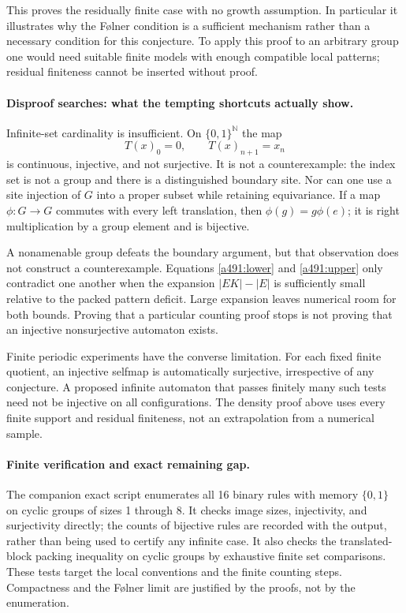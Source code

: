 \documentclass[11pt]{article}
\begin{document}
This proves the residually finite case with no growth assumption. In
particular it illustrates why the F\o lner condition is a sufficient
mechanism rather than a necessary condition for this conjecture. To apply
this proof to an arbitrary group one would need suitable finite models
with enough compatible local patterns; residual finiteness cannot be
inserted without proof.

\paragraph{Disproof searches: what the tempting shortcuts actually show.}
Infinite-set cardinality is insufficient. On $\{0,1\}^{\mathbb N}$ the map
\[
 T(x)_0=0,\qquad T(x)_{n+1}=x_n
\]
is continuous, injective, and not surjective. It is not a counterexample:
the index set is not a group and there is a distinguished boundary site.
Nor can one use a site injection of $G$ into a proper subset while retaining
equivariance. If a map $\phi:G\to G$ commutes with every left translation,
then $\phi(g)=g\phi(e)$; it is right multiplication by a group element
and is bijective.

A nonamenable group defeats the boundary argument, but that observation
does not construct a counterexample. Equations \eqref{a491:lower} and
\eqref{a491:upper} only contradict one another when the expansion
$|EK|-|E|$ is sufficiently small relative to the packed pattern deficit.
Large expansion leaves numerical room for both bounds. Proving that a
particular counting proof stops is not proving that an injective nonsurjective
automaton exists.

Finite periodic experiments have the converse limitation. For each
fixed finite quotient, an injective selfmap is automatically surjective,
irrespective of any conjecture. A proposed infinite automaton that passes
finitely many such tests need not be injective on all configurations.
The density proof above uses every finite support and residual finiteness,
not an extrapolation from a numerical sample.

\paragraph{Finite verification and exact remaining gap.}
The companion exact script enumerates all 16 binary rules with memory
$\{0,1\}$ on cyclic groups of sizes 1 through 8. It checks image sizes,
injectivity, and surjectivity directly; the counts of bijective rules are
recorded with the output, rather than being used to certify any infinite
case. It also checks the translated-block packing inequality on cyclic
groups by exhaustive finite set comparisons. These tests target the local
conventions and the finite counting steps. Compactness and the F\o lner
limit are justified by the proofs, not by the enumeration.
\end{document}

